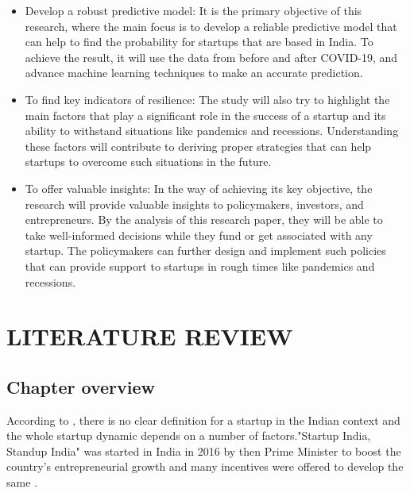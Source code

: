 \documentclass[12pt]{article}
\begin{document}
\begin{itemize}

\item Develop a robust predictive model: It is the primary objective of this research, where the main focus is to develop a reliable predictive model that can help to find the probability for startups that are based in India. To achieve the result, it will use the data from before and after COVID-19, and advance machine learning techniques to make an accurate prediction. 

\item To find key indicators of resilience: The study will also try to highlight the main factors that play a significant role in the success of a startup and its ability to withstand situations like pandemics and recessions. Understanding these factors will contribute to deriving proper strategies that can help startups to overcome such situations in the future. 

\item To offer valuable insights: In the way of achieving its key objective, the research will provide valuable insights to policymakers, investors, and entrepreneurs. By the analysis of this research paper, they will be able to take well-informed decisions while they fund or get associated with any startup. The policymakers can further design and implement such policies that can provide support to startups in rough times like pandemics and recessions. 

\end{itemize}

\pagebreak
\section{LITERATURE REVIEW}

\subsection{Chapter overview}
According to \citep{jain2016growth}, there is no clear definition for a startup in the Indian context and the whole startup dynamic depends on a number of factors."Startup India, Standup India" was started in India in 2016 by then Prime Minister to boost the country's entrepreneurial growth and many incentives were offered to develop the same \citep{jain2016growth}. 
\end{document}
